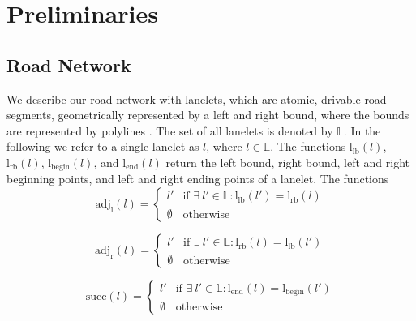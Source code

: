 
\section{Preliminaries}
\label{sec:preliminaries}
\subsection{Road Network}
We describe our road network with lanelets, which are atomic, drivable road segments, geometrically represented by a left and right bound, where the bounds are represented by polylines \cite{Bender2014}. The set of all lanelets is denoted by $\mathbb{L}$. In the following we refer to a single lanelet as $l$, where $l \in \mathbb{L}$. 
The functions $\mathrm{l}_\mathrm{lb}(l)$, $\mathrm{l}_\mathrm{rb}(l)$, $\mathrm{l}_\mathrm{begin}(l)$, and $\mathrm{l}_\mathrm{end}(l)$ return the left bound, right bound, left and right beginning points, and left and right ending points of a lanelet. The functions
\begin{equation}
\mathrm{adj}_\mathrm{l}(l) =
\begin{cases} 
l' & \text{if } \exists \ l' \in \mathbb{L}: \mathrm{l}_\mathrm{lb}(l') = \mathrm{l}_\mathrm{rb}(l) \\ 
\emptyset & \text{otherwise} 
\end{cases}	
\end{equation}

\begin{equation}
\mathrm{adj}_\mathrm{r}(l) =
\begin{cases} 
l' & \text{if } \exists \ l' \in \mathbb{L}: \mathrm{l}_\mathrm{rb}(l) = \mathrm{l}_\mathrm{lb}(l') \\ 
\emptyset & \text{otherwise} 
\end{cases}	
\end{equation}

\begin{equation}
\mathrm{succ}(l) =
\begin{cases} 
l' & \text{if } \exists \ l' \in \mathbb{L}: \mathrm{l}_\mathrm{end}(l) = \mathrm{l}_\mathrm{begin}(l') \\ 
\emptyset & \text{otherwise} 
\end{cases}	
\end{equation}

